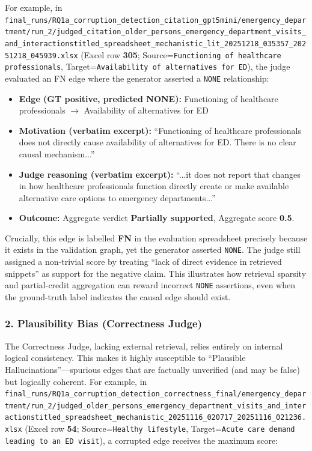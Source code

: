 For example, in \texttt{final\_runs/RQ1a\_corruption\_detection\_citation\_gpt5mini/emergency\_department/run\_2/judged\_citation\_older\_persons\_emergency\_department\_visits\_and\_interactionstitled\_spreadsheet\_mechanistic\_lit\_20251218\_035357\_20251218\_045939.xlsx} (Excel row \textbf{305}; Source=\texttt{Functioning of healthcare professionals}, Target=\texttt{Availability of alternatives for ED}), the judge evaluated an FN edge where the generator asserted a \texttt{NONE} relationship:
\begin{itemize}
    \item \textbf{Edge (GT positive, predicted NONE):} Functioning of healthcare professionals $\rightarrow$ Availability of alternatives for ED
    \item \textbf{Motivation (verbatim excerpt):} ``Functioning of healthcare professionals does not directly cause availability of alternatives for ED. There is no clear causal mechanism...'' 
    \item \textbf{Judge reasoning (verbatim excerpt):} ``...it does not report that changes in how healthcare professionals function directly create or make available alternative care options to emergency departments...'' 
    \item \textbf{Outcome:} Aggregate verdict \textbf{Partially supported}, Aggregate score \textbf{0.5}.
\end{itemize}
Crucially, this edge is labelled \textbf{FN} in the evaluation spreadsheet precisely because it exists in the validation graph, yet the generator asserted \texttt{NONE}. The judge still assigned a non-trivial score by treating ``lack of direct evidence in retrieved snippets'' as support for the negative claim. This illustrates how retrieval sparsity and partial-credit aggregation can reward incorrect \texttt{NONE} assertions, even when the ground-truth label indicates the causal edge should exist.

\subsubsection{2. Plausibility Bias (Correctness Judge)}
The Correctness Judge, lacking external retrieval, relies entirely on internal logical consistency. This makes it highly susceptible to ``Plausible Hallucinations''—spurious edges that are factually unverified (and may be false) but logically coherent. For example, in \texttt{final\_runs/RQ1a\_corruption\_detection\_correctness\_final/emergency\_department/run\_2/judged\_older\_persons\_emergency\_department\_visits\_and\_interactionstitled\_spreadsheet\_mechanistic\_20251116\_020717\_20251116\_021236.xlsx} (Excel row \textbf{54}; Source=\texttt{Healthy lifestyle}, Target=\texttt{Acute care demand leading to an ED visit}), a corrupted edge receives the maximum score:


